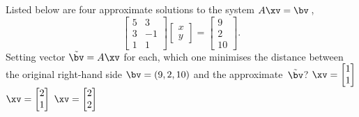\begin{activity}
Listed below are four approximate solutions to the system \(A\xv=\bv\)\,,
\begin{equation*}
\begin{bmatrix} 5&3\\3&-1\\1&1 \end{bmatrix}\begin{bmatrix} x\\y \end{bmatrix}=\begin{bmatrix} 9\\2\\10 \end{bmatrix}.
\end{equation*}
Setting vector \(\tilde\bv=A\xv\) for each, which one minimises the distance between the original right-hand side \(\bv=(9,2,10)\) and the approximate~\(\tilde\bv\)?
{\(\xv=\begin{bmatrix} 1\\1 \end{bmatrix}\)}
{\(\xv=\begin{bmatrix} 2\\1 \end{bmatrix}\)}
{\(\xv=\begin{bmatrix} 2\\2 \end{bmatrix}\)}
\end{activity}



